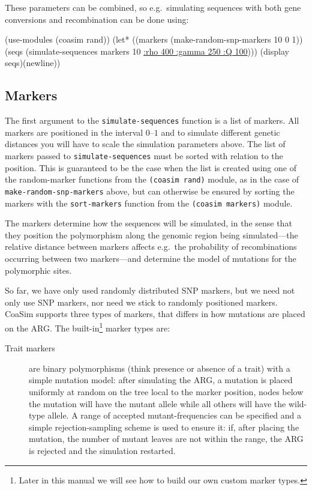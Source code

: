 \documentclass{manual}
\begin{document}
\begin{empfile}
These parameters can be combined, so e.g.\ simulating sequences with both
gene conversions and recombination can be done using:
\begin{code}
(use-modules (coasim rand))
(let* ((markers (make-random-snp-markers 10 0 1))
       (seqs (simulate-sequences markers 10 \underline{:rho 400 :gamma 250 :Q 100})))
  (display seqs)(newline))
\end{code}


\subsection{Markers}
\label{sec:markers}

The first argument to the \texttt{simulate-sequences} function is a
list of markers.  All markers are positioned in the interval $0$--$1$
and to simulate different genetic distances you will have to scale the
simulation parameters above.  The list of markers passed to
\texttt{simulate-sequences} must be sorted with relation to the
position.  This is guaranteed to be the case when the list is created
using one of the random-marker functions from the \texttt{(coasim
  rand)} module, as in the case of \texttt{make-random-snp-markers}
above, but can otherwise be ensured by sorting the markers with the
\texttt{sort-markers} function from the \texttt{(coasim markers)}
module.

The markers determine how the sequences will be simulated, in the
sense that they position the polymorphism along the genomic region
being simulated---the relative distance between markers affects e.g.\ 
the probability of recombinations occurring between two markers---and
determine the model of mutations for the polymorphic sites.

So far, we have only used randomly distributed SNP markers, but we
need not only use SNP markers, nor need we stick to randomly
positioned markers.  CoaSim supports three types of markers, that
differs in how mutations are placed on the ARG.  The
built-in\footnote{Later in this manual we will see how to build our
  own custom marker types.} marker types are:
\begin{description}
\item[Trait markers] are binary polymorphisms (think presence or
  absence of a trait) with a simple mutation model: after simulating
  the ARG, a mutation is placed uniformly at random on the tree local
  to the marker position, nodes below the mutation will have the
  mutant allele while all others will have the wild-type allele.  A
  range of accepted mutant-frequencies can be specified and a simple
  rejection-sampling scheme is used to ensure it: if, after placing
  the mutation, the number of mutant leaves are not within the range,
  the ARG is rejected and the simulation restarted.
  

\end{description}
\end{empfile}
\end{document}

